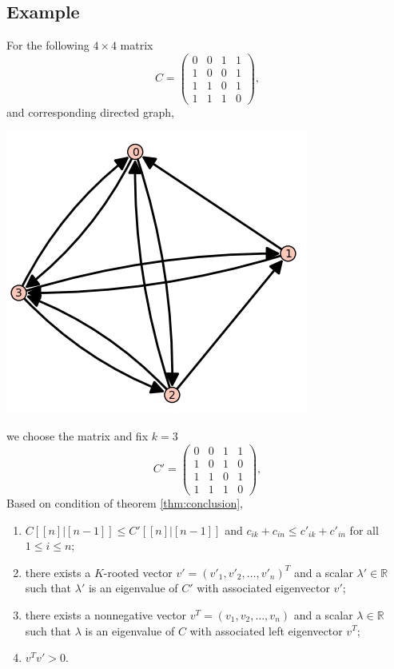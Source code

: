\documentclass[12pt, a4paper]{article}
\theoremstyle{plain}
\theoremstyle{definition}
\begin{document}
\subsection{Example}
    For the following $4\times 4$ matrix
    $$C=\begin{pmatrix}
    0 & 0 & 1 & 1\\
    1 & 0 & 0 & 1\\
    1 & 1 & 0 & 1\\
    1 & 1 & 1 & 0
    \end{pmatrix},$$
    and corresponding directed graph, \cite[sage]{sage}
    \begin{center}
    \includegraphics{graph_C.PNG}
    \end{center}
    we choose the matrix and fix $k = 3$
    $$C'=\begin{pmatrix}
    0 & 0 & 1 & 1\\
    1 & 0 & 1 & 0\\
    1 & 1 & 0 & 1\\
    1 & 1 & 1 & 0
    \end{pmatrix},$$
    Based on condition of theorem \ref{thm:conclusion},
    \begin{enumerate}[label=(\roman*)]
        \item  $C[[n]|[n-1]]\leq C'[[n]|[n-1]]$ and $c_{ik}+c_{in}\leq c'_{ik}+c'_{in}$ for all $1\leq i\leq n$;
        \item  there exists a $K$-rooted vector $v'=(v'_1, v'_2, \ldots, v'_n)^T$ and a scalar $\lambda'\in \mathbb{R}$
        such that $\lambda'$ is an eigenvalue of $C'$ with associated eigenvector $v'$;
        \item there exists a nonnegative vector $v^T=(v_1, v_2, \ldots, v_n)$ and a scalar $\lambda\in \mathbb{R}$ 
        such that $\lambda$ is an eigenvalue of $C$ with associated left eigenvector $v^T$;
        \item $v^Tv'>0.$
    \end{enumerate}
\end{document}
